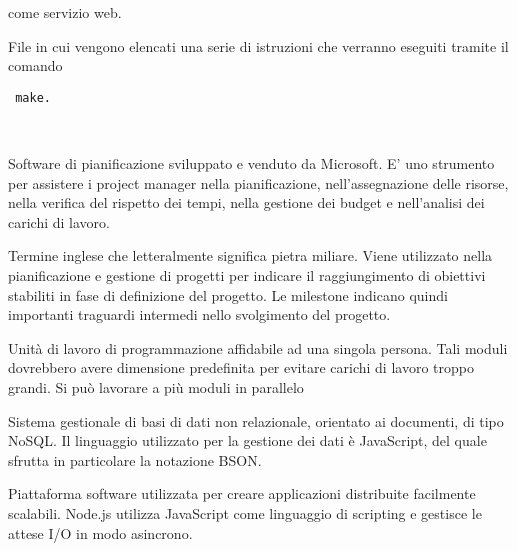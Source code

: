 
\ProjectName come servizio web. \\


File in cui vengono elencati una serie di istruzioni che verranno eseguiti tramite il comando \begin{lstlisting} make. \end{lstlisting} \\





Software di pianificazione sviluppato e venduto da Microsoft. E'  uno strumento per assistere i project manager nella pianificazione, nell'assegnazione delle risorse, nella verifica del rispetto dei tempi, nella gestione dei budget e nell'analisi dei carichi di lavoro. \\


Termine inglese che letteralmente significa pietra miliare. Viene utilizzato nella pianificazione e gestione di progetti per indicare il raggiungimento di obiettivi stabiliti in fase di definizione del progetto. 
Le milestone indicano quindi importanti traguardi intermedi nello svolgimento del progetto. \\


Unità di lavoro di programmazione affidabile ad una singola persona. Tali moduli dovrebbero avere dimensione predefinita per evitare carichi di lavoro troppo grandi. Si può lavorare a più moduli in parallelo \\ 


Sistema gestionale di basi di dati non relazionale, orientato ai documenti, di tipo NoSQL. Il linguaggio utilizzato per la gestione dei dati è JavaScript, del quale sfrutta in particolare la notazione BSON. \\






Piattaforma software utilizzata per creare applicazioni distribuite facilmente scalabili.
Node.js utilizza JavaScript come linguaggio di scripting e gestisce le attese I/O in modo asincrono.

